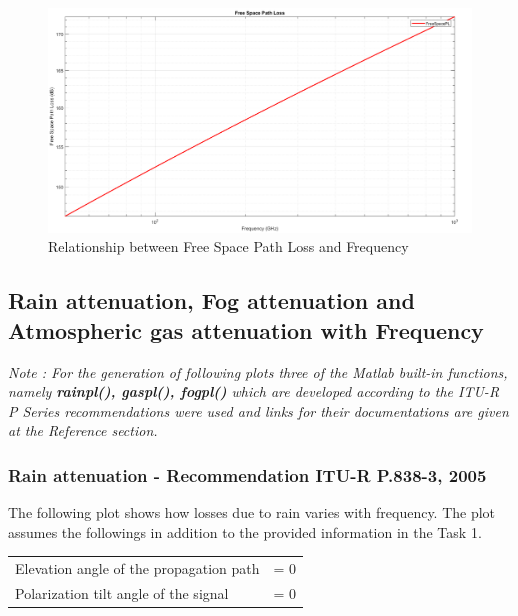 \documentclass[a4paper,11pt]{article}%
\begin{document}
\begin{figure}[!h]
	\centering
	\includegraphics[scale=0.35]{figures/FreeSpacePL.png}
	\caption{Relationship between Free Space Path Loss and Frequency}
\end{figure}



\pagebreak
\subsection{Rain attenuation, Fog attenuation and Atmospheric gas attenuation with Frequency}

\textit{Note : For the generation of following plots three of the Matlab built-in functions, namely \textbf{rainpl()\cite{matlab}, gaspl()\cite{matlab}, fogpl()\cite{matlab}} which are developed according to the ITU-R P Series recommendations were used and links for their documentations are given at the Reference section.}


\subsubsection{Rain attenuation - Recommendation ITU-R P.838-3, 2005\cite{rain}}
The following plot shows how losses due to rain varies with frequency. The plot assumes the followings in addition to the provided information in the Task 1.\\

\begin{tabular}{l l}
Elevation angle of the propagation path& = 0 \\
Polarization tilt angle of the signal &= 0\\
\end{tabular}\\
\end{document}
